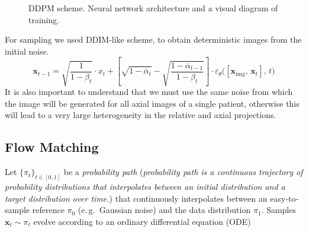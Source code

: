\documentclass{article}
\begin{document}
\begin{figure}[h!]
  \centering
  \caption{DDPM scheme. Neural network architecture and a visual diagram of training.}
\end{figure}


For sampling we used DDIM-like scheme, to obtain deterministic images from the initial noise.
\begin{equation*}
    \mathbf{x}_{t-1}      =  \sqrt{\frac{1}{1-\beta_t}} \cdot x_t + \left[\sqrt{1-\overline{\alpha}_t} - \sqrt{\frac{1-\overline{\alpha}_{t-1}}{1-\beta_t}} \right] \cdot \varepsilon_\theta\bigl([\mathbf{x}_{\mathrm{img}},\,\mathbf{x}_{t}],\,t\bigr)  
\end{equation*}
It is also important to understand that we must use the same noise from which the image will be generated for all axial images of a single patient, otherwise this will lead to a very large heterogeneity in the relative and axial projections.
  
\subsection{Flow Matching}
\label{sec:fm_math}
Let $\{\pi_{t}\}_{t\in[0,1]}$ be a \emph{probability
path} (\emph{probability path is a continuous trajectory of probability distributions that interpolates between an initial distribution and a target distribution over time.}) that continuously interpolates between an easy‐to‐sample
reference $\pi_{0}$ (e.\,g.\ Gaussian noise) and the data distribution
$\pi_{1}$.
Samples $\mathbf{x}_{t}\!\sim\!\pi_{t}$ evolve according to an ordinary
differential equation (ODE)
\end{document}
